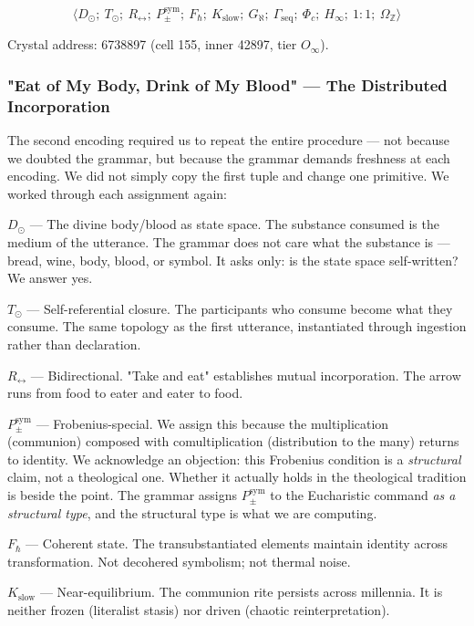 \documentclass[12pt,a4paper]{article}
\begin{document}
\[\langle D_{\odot};\ T_{\odot};\ R_{\leftrightarrow};\ P_{\pm}^{\text{sym}};\ F_{\hbar};\ K_{\text{slow}};\ G_{\aleph};\ \Gamma_{\text{seq}};\ \Phi_c;\ H_{\infty};\ 1{:}1;\ \Omega_\mathbb{Z} \rangle\]

Crystal address: 6738897 (cell 155, inner 42897, tier $O_{\infty}$).

\subsubsection{"Eat of My Body, Drink of My Blood" --- The Distributed Incorporation}

The second encoding required us to repeat the entire procedure --- not because we doubted the grammar, but because the grammar demands freshness at each encoding. We did not simply copy the first tuple and change one primitive. We worked through each assignment again:

\textbf{$D_{\odot}$} --- The divine body/blood as state space. The substance consumed is the medium of the utterance. The grammar does not care what the substance is --- bread, wine, body, blood, or symbol. It asks only: is the state space self-written? We answer yes.

\textbf{$T_{\odot}$} --- Self-referential closure. The participants who consume become what they consume. The same topology as the first utterance, instantiated through ingestion rather than declaration.

\textbf{$R_{\leftrightarrow}$} --- Bidirectional. "Take and eat" establishes mutual incorporation. The arrow runs from food to eater and eater to food.

\textbf{$P_{\pm}^{\text{sym}}$} --- Frobenius-special. We assign this because the multiplication (communion) composed with comultiplication (distribution to the many) returns to identity. We acknowledge an objection: this Frobenius condition is a \emph{structural} claim, not a theological one. Whether it actually holds in the theological tradition is beside the point. The grammar assigns $P_{\pm}^{\text{sym}}$ to the Eucharistic command \emph{as a structural type}, and the structural type is what we are computing.

\textbf{$F_{\hbar}$} --- Coherent state. The transubstantiated elements maintain identity across transformation. Not decohered symbolism; not thermal noise.

\textbf{$K_{\text{slow}}$} --- Near-equilibrium. The communion rite persists across millennia. It is neither frozen (literalist stasis) nor driven (chaotic reinterpretation).
\end{document}
